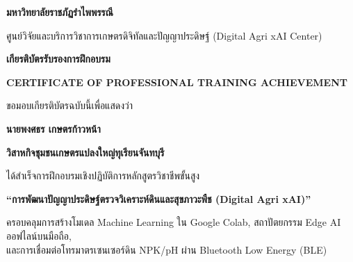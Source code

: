 \documentclass[landscape,a4paper]{article}
\begin{document}
\begin{center}
    \vspace*{0.3cm}
    
    {\fontsize{22}{26}\selectfont\bfseries\color{obsidian} มหาวิทยาลัยราชภัฏรำไพพรรณี}\par
    \vspace{0.15cm}
    {\fontsize{16}{20}\selectfont\color{emeralddeep} ศูนย์วิจัยและบริการวิชาการเกษตรดิจิทัลและปัญญาประดิษฐ์ (Digital Agri xAI Center)}\par
    \vspace{0.5cm}
    
    {\fontsize{34}{40}\selectfont\bfseries\color{emeralddeep} เกียรติบัตรรับรองการฝึกอบรม}\par
    \vspace{0.15cm}
    {\fontsize{15}{18}\selectfont\color{golddark}\bfseries CERTIFICATE OF PROFESSIONAL TRAINING ACHIEVEMENT}\par
    \vspace{0.5cm}
    
    {\fontsize{18}{22}\selectfont ขอมอบเกียรติบัตรฉบับนี้เพื่อแสดงว่า}\par
    \vspace{0.4cm}
    
    {\fontsize{32}{36}\selectfont\bfseries\color{obsidian} นายพงศธร เกษตรก้าวหน้า}\par
    \vspace{0.15cm}
    {\fontsize{16}{20}\selectfont\color{cybercyan}\bfseries วิสาหกิจชุมชนเกษตรแปลงใหญ่ทุเรียนจันทบุรี}\par
    \vspace{0.45cm}
    
    {\fontsize{17}{21}\selectfont ได้สำเร็จการฝึกอบรมเชิงปฏิบัติการหลักสูตรวิชาชีพขั้นสูง}\par
    \vspace{0.25cm}
    {\fontsize{22}{26}\selectfont\bfseries\color{emeralddeep} ``การพัฒนาปัญญาประดิษฐ์ตรวจวิเคราะห์ดินและสุขภาวะพืช (Digital Agri xAI)''}\par
    \vspace{0.2cm}
    {\fontsize{15}{19}\selectfont ครอบคลุมการสร้างโมเดล Machine Learning ใน Google Colab, สถาปัตยกรรม Edge AI ออฟไลน์บนมือถือ,\\และการเชื่อมต่อโทรมาตรเซนเซอร์ดิน NPK/pH ผ่าน Bluetooth Low Energy (BLE)}\par
    
\end{center}
\end{document}
